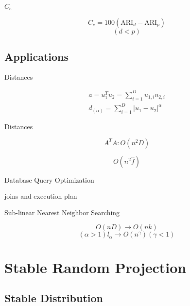 \documentclass[ignorenonframetext,]{beamer}
\begin{document}
\begin{frame}{\(C_e\)}

\[ C_e = 100 (\mathrm{ARI}_d - \mathrm{ARI}_p  ) \] \[ (d<p) \]

\end{frame}

\subsection{Applications}\label{applications}

\begin{frame}{Distances}

\begin{align}
a=u_1^T u_2 = \sum_{i=1}^{D} u_{1,i} u_{2,i} \\
d_{(\alpha)} = \sum_{i=1}^{D} \mathopen| u_1 - u_2 \mathclose|^\alpha 
\label{eq:1hP}
\end{align}

\end{frame}

\begin{frame}{Distances}

\[ A^T A : O(n^2D)\]

\[ O(n^2 \hat{f}) \]

\end{frame}

\begin{frame}{Database Query Optimization}

joins and execution plan

\end{frame}

\begin{frame}{Sub-linear Nearest Neighbor Searching}

\[ O(nD) \rightarrow O(nk) \]
\[ (\alpha > 1) l_\alpha \rightarrow O(n^\gamma) (\gamma < 1) \]

\end{frame}

\section{Stable Random Projection}\label{stable-random-projection}

\subsection{Stable Distribution}\label{stable-distribution}
\end{document}
